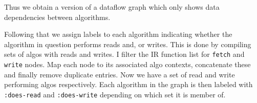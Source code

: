 Thus we obtain a version of a dataflow graph which only shows data dependencies between algorithms.

Following that we assign labels to each algorithm indicating whether the algorithm in question performs reads and, or writes.
This is done by compiling sets of algos with reads and writes.
I filter the IR function list for \texttt{fetch} and \texttt{write} nodes.
Map each node to its associated algo contexts, concatenate these and finally remove duplicate entries.
Now we have a set of read and write performing algos respectively.
Each algorithm in the graph is then labeled with \texttt{:does-read} and \texttt{:does-write} depending on which set it is member of.
